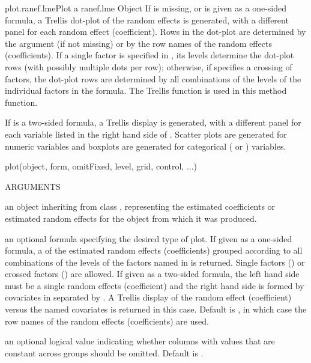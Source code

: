 \documentclass[pdftex]{article} \usepackage{url,graphicx}
\renewcommand{\Twiddle}{\mbox{\(\sim\)}}
\begin{document}
\begin{Helpfile}{plot.ranef.lme}{Plot a ranef.lme Object}
If  is missing, or is given as a one-sided formula, a
Trellis dot-plot of the random effects is generated, with a different
panel for each random effect (coefficient). Rows in the dot-plot are
determined by the  argument (if not missing) or by the row
names of the random effects (coefficients). If a single factor is
specified in , its levels determine the dot-plot rows
(with possibly multiple dots per row); otherwise, if 
specifies a crossing of factors, the dot-plot rows are determined by
all combinations of the levels of the individual factors in the 
formula. The Trellis function  is used in this method
function.

If  is a two-sided formula, a Trellis display is generated,
with a different panel for each variable listed in the right hand side
of . Scatter plots are generated for numeric variables and
boxplots are generated for categorical ( or
) variables.
\begin{Example}
plot(object, form, omitFixed, level, grid, control, ...)
\end{Example}
\begin{Argument}{ARGUMENTS}
\item[\Co{object:}]
an object inheriting from class
, representing the estimated coefficients or
estimated random effects for the  object from which it was
produced.
\item[\Co{form:}]
an optional formula specifying the desired type of plot. If
given as a one-sided formula, a  of the estimated
random effects (coefficients) grouped according to all combinations of
the levels of the factors named in  is returned. Single
factors (\Co{{\Twiddle}g}) or crossed factors (\Co{{\Twiddle}g1*g2}) are
allowed. If given as a two-sided formula, the left hand side must
be a single random effects (coefficient) and the right hand side
is formed by covariates in  separated by \Co{+}. A
Trellis display of the random effect (coefficient) versus the named
covariates is returned in this case. Default is , in
which case  the row names of the random effects (coefficients) are
used.
\item[\Co{omitFixed:}]
an optional logical value indicating whether
columns with values that are constant across groups should be
omitted. Default is .
\item[\Co{level:}]

\end{Argument}
\end{Helpfile}
\end{document}
